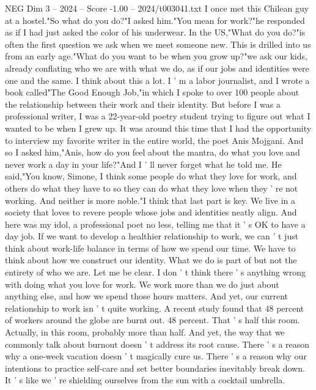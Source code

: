 \begin{textsample}{NEG Dim 3 – 2024 – Score -1.00 – 2024/t003041.txt}  \label{ex:f3_neg_058}
I once met this Chilean guy at a hostel."So what do you do?"I asked him."You mean for work?"he responded as if I had just asked the color of his underwear.
In the US,"What do you do?"is often the first question we ask when we meet someone new.
This is drilled into us from an early age."What do you want to be when you grow up?"we ask our kids, already conflating who we are with what we do, as if our jobs and identities were one and the same.
I think about this a lot.
I ' m a labor journalist, and I wrote a book called"The Good Enough Job,"in which I spoke to over 100 people about the relationship between their work and their identity.
But before I was a professional writer, I was a 22-year-old poetry student trying to figure out what I wanted to be when I grew up.
It was around this time that I had the opportunity to interview my favorite writer in the entire world, the poet Anis Mojgani.
And so I asked him,"Anis, how do you feel about the mantra, do what you love and never work a day in your life?"And I ' ll never forget what he told me.
He said,"You know, Simone, I think some people do what they love for work, and others do what they have to so they can do what they love when they ' re not working.
And neither is more noble."I think that last part is key.
We live in a society that loves to revere people whose jobs and identities neatly align.
And here was my idol, a professional poet no less, telling me that it ' s OK to have a day job.
If we want to develop a healthier relationship to work, we can ' t just think about work-life balance in terms of how we spend our time.
We have to think about how we construct our identity.
What we do is part of but not the entirety of who we are.
Let me be clear.
I don ' t think there ' s anything wrong with doing what you love for work.
We work more than we do just about anything else, and how we spend those hours matters.
And yet, our current relationship to work isn ' t quite working.
A recent study found that 48 percent of workers around the globe are burnt out. 48 percent.
That ' s half this room.
Actually, in this room, probably more than half.
And yet, the way that we commonly talk about burnout doesn ' t address its root cause.
There ' s a reason why a one-week vacation doesn ' t magically cure us.
There ' s a reason why our intentions to practice self-care and set better boundaries inevitably break down.
It ' s like we ' re shielding ourselves from the sun with a cocktail umbrella.

\end{textsample}
